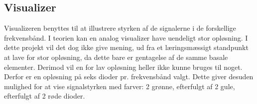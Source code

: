 
\subsection{Visualizer}
\label{visualizer}
Visualizeren benyttes til at illustrere styrken af de signalerne i de forskellige frekvensbånd. I teorien kan en analog visualizer have uendeligt stor opløsning. I dette projekt vil det dog ikke give mening, ud fra et læringsmæssigt standpunkt at lave for stor opløsning, da dette bare er gentagelse af de samme basale elementer. Derimod vil en for lav opløsning heller ikke kunne bruges til noget. Derfor er en opløsning på seks dioder pr. frekvensbånd valgt. Dette giver desuden mulighed for at vise signalstyrken med farver: 2 grønne, efterfulgt af 2 gule, efterfulgt af 2 røde dioder.
